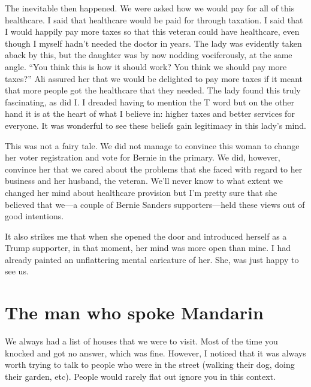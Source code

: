 \documentclass[]{book}
\begin{document}
The inevitable then happened. We were asked how we would pay for all of this healthcare. I said that healthcare would be paid for through taxation. I said that I would happily pay more taxes so that this veteran could have healthcare, even though I myself hadn't needed the doctor in years. The lady was evidently taken aback by this, but the daughter was by now nodding vociferously, at the same angle. ``You think this is how it should work? You think we should pay more taxes?'' Ali assured her that we would be delighted to pay more taxes if it meant that more people got the healthcare that they needed. The lady found this truly fascinating, as did I. I dreaded having to mention the T word but on the other hand it is at the heart of what I believe in: higher taxes and better services for everyone. It was wonderful to see these beliefs gain legitimacy in this lady's mind.

This was not a fairy tale. We did not manage to convince this woman to change her voter registration and vote for Bernie in the primary. We did, however, convince her that we cared about the problems that she faced with regard to her business and her husband, the veteran. We'll never know to what extent we changed her mind about healthcare provision but I'm pretty sure that she believed that we---a couple of Bernie Sanders supporters---held these views out of good intentions.

It also strikes me that when she opened the door and introduced herself as a Trump supporter, in that moment, her mind was more open than mine. I had already painted an unflattering mental caricature of her. She, was just happy to see us.

\hypertarget{the-man-who-spoke-mandarin}{%
\section{The man who spoke Mandarin}\label{the-man-who-spoke-mandarin}}

We always had a list of houses that we were to visit. Most of the time you knocked and got no answer, which was fine. However, I noticed that it was always worth trying to talk to people who were in the street (walking their dog, doing their garden, etc). People would rarely flat out ignore you in this context.
\end{document}
